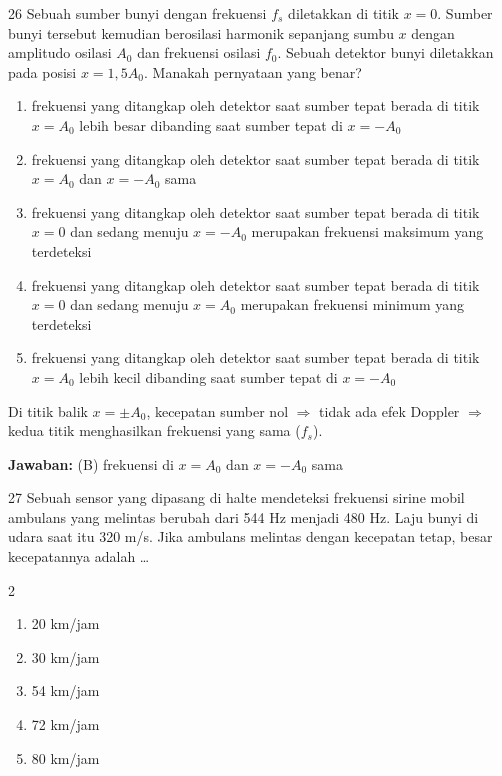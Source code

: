 \documentclass[11pt]{article}
\newenvironment{pil}{%
  \begin{enumerate}[label=(\Alph*),leftmargin=*,itemsep=1pt,topsep=3pt]}%
  {\end{enumerate}}
\newenvironment{pilB}{%
  \par\smallskip\begin{multicols}{2}
  \begin{enumerate}[label=(\Alph*),leftmargin=*,itemsep=1pt,topsep=3pt]}%
  {\end{enumerate}\end{multicols}}
\newcommand{\jawaban}[1]{%
  \noindent\colorbox{gold!30}{\parbox{\dimexpr\linewidth-2\fboxsep\relax}{%
    \textbf{Jawaban:} #1}}\par\smallskip}
\begin{document}
\begin{soal}{26}
Sebuah sumber bunyi dengan frekuensi $f_s$ diletakkan di titik $x=0$.
Sumber bunyi tersebut kemudian berosilasi harmonik sepanjang sumbu $x$
dengan amplitudo osilasi $A_0$ dan frekuensi osilasi $f_0$. Sebuah
detektor bunyi diletakkan pada posisi $x=1{,}5A_0$. Manakah pernyataan
yang benar?
\begin{pil}
  \item frekuensi yang ditangkap oleh detektor saat sumber tepat berada di
        titik $x=A_0$ lebih besar dibanding saat sumber tepat di $x=-A_0$
  \item frekuensi yang ditangkap oleh detektor saat sumber tepat berada di
        titik $x=A_0$ dan $x=-A_0$ sama
  \item frekuensi yang ditangkap oleh detektor saat sumber tepat berada di
        titik $x=0$ dan sedang menuju $x=-A_0$ merupakan frekuensi maksimum
        yang terdeteksi
  \item frekuensi yang ditangkap oleh detektor saat sumber tepat berada di
        titik $x=0$ dan sedang menuju $x=A_0$ merupakan frekuensi minimum
        yang terdeteksi
  \item frekuensi yang ditangkap oleh detektor saat sumber tepat berada di
        titik $x=A_0$ lebih kecil dibanding saat sumber tepat di $x=-A_0$
\end{pil}
\end{soal}

\begin{pembox}
Di titik balik $x=\pm A_0$, kecepatan sumber nol $\Rightarrow$ tidak ada efek Doppler $\Rightarrow$ kedua titik menghasilkan frekuensi yang sama ($f_s$).
\jawaban{(B) frekuensi di $x=A_0$ dan $x=-A_0$ sama}
\end{pembox}

\begin{soal}{27}
Sebuah sensor yang dipasang di halte mendeteksi frekuensi sirine mobil
ambulans yang melintas berubah dari 544 Hz menjadi 480 Hz. Laju bunyi
di udara saat itu 320 m/s. Jika ambulans melintas dengan kecepatan tetap,
besar kecepatannya adalah \ldots
\begin{pilB}
  \item 20 km/jam \item 30 km/jam \item 54 km/jam \item 72 km/jam \item 80 km/jam
\end{pilB}
\end{soal}
\end{document}
